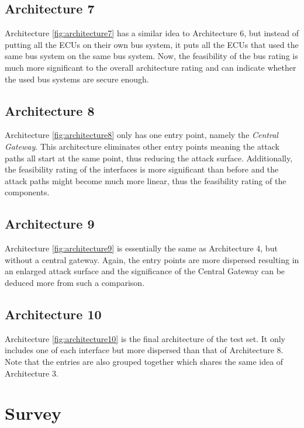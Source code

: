\subsection{Architecture 7}
\label{subsec:arch7}

Architecture \ref{fig:architecture7} has a similar idea to Architecture 6, 
but instead of putting all the ECUs on their own bus system, it puts all the ECUs that used the same bus system on the same bus system. 
Now, the feasibility of the bus rating is much more significant to the overall architecture rating and can indicate whether the used bus systems are secure enough.

\subsection{Architecture 8}
\label{subsec:arch8}

Architecture \ref{fig:architecture8} only has one entry point, namely the \textit{Central Gateway}. 
This architecture eliminates other entry points meaning the attack paths all start at the same point, thus reducing the attack surface. 
Additionally, the feasibility rating of the interfaces is more significant than before and the attack paths might become much more linear, 
thus the feasibility rating of the components.

\subsection{Architecture 9}
\label{subsec:arch9}

Architecture \ref{fig:architecture9} is essentially the same as Architecture 4, 
but without a central gateway. Again, the entry points are more dispersed resulting in an enlarged attack surface 
and the significance of the Central Gateway can be deduced more from such a comparison.

\subsection{Architecture 10}
\label{subsec:arch10}

Architecture \ref{fig:architecture10} is the final architecture of the test set. 
It only includes one of each interface but more dispersed than that of Architecture 8. 
Note that the entries are also grouped together which shares the same idea of Architecture 3.

\section{Survey}
\label{sec:survey}

